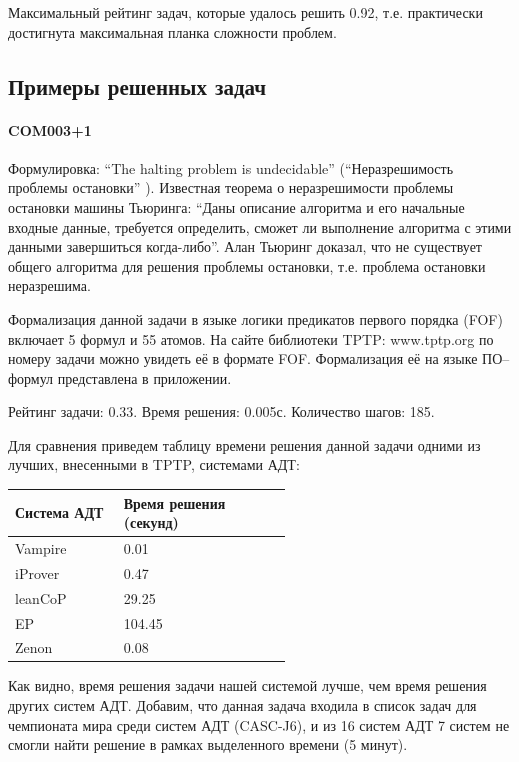 Максимальный рейтинг задач, которые удалось решить 0.92, т.е. практически достигнута максимальная планка сложности проблем.




\subsection{Примеры решенных задач}

\paragraph{COM003+1}
Формулировка: ``The halting problem is undecidable'' (``Неразрешимость проблемы остановки'' \cite{turing}). Известная теорема о неразрешимости проблемы остановки машины Тьюринга: ``Даны описание алгоритма и его начальные входные данные, требуется определить, сможет ли выполнение алгоритма с этими данными завершиться когда-либо''. Алан Тьюринг доказал, что не существует общего алгоритма для решения проблемы остановки, т.е. проблема остановки неразрешима.

Формализация данной задачи в языке логики предикатов первого порядка (FOF) включает 5 формул и 55 атомов. На сайте библиотеки TPTP: www.tptp.org по номеру задачи можно увидеть её в формате FOF. Формализация её на языке ПО--формул представлена в приложении.

Рейтинг задачи: 0.33. Время решения: 0.005с. Количество шагов: 185.

Для сравнения приведем таблицу времени решения данной задачи одними из лучших, внесенными в TPTP, системами АДТ:

\begin{longtable}[H]{|p{0.2\linewidth}|p{0.35\linewidth}|}
\hline
\textbf{Система АДТ} & \textbf{Время решения (секунд)}  \\
\hline
Vampire & 0.01 \\
\hline
iProver & 0.47 \\
\hline
leanCoP & 29.25 \\
\hline
EP & 104.45  \\
\hline
Zenon & 0.08 \\
\hline
\end{longtable}


Как видно, время решения задачи нашей системой лучше, чем время решения других систем АДТ. Добавим, что данная задача входила в список задач для чемпионата мира среди систем АДТ (CASC-J6), и из 16 систем АДТ 7 систем не смогли найти решение в рамках выделенного времени (5 минут).

